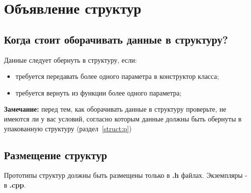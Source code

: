 \chapter{Объявление структур}\label{struct}
\section{Когда стоит оборачивать данные в структуру?}
Данные следует обернуть в структуру, если:
\begin{itemize}
	\item требуется передавать более одного параметра в конструктор класса;
	\item требуется вернуть из функции более одного параметра;
\end{itemize}
\textbf{Замечание: }перед тем, как оборачивать данные в структуру проверьте, не имеются ли у вас условий, согласно которым данные должны быть обернуты в упакованную структуру (раздел~\ref{struct:p})
\section{Размещение структур}
Прототипы структур должны быть размещены только в \textbf{.h} файлах. Экземпляры - в \textbf{.cpp}.

